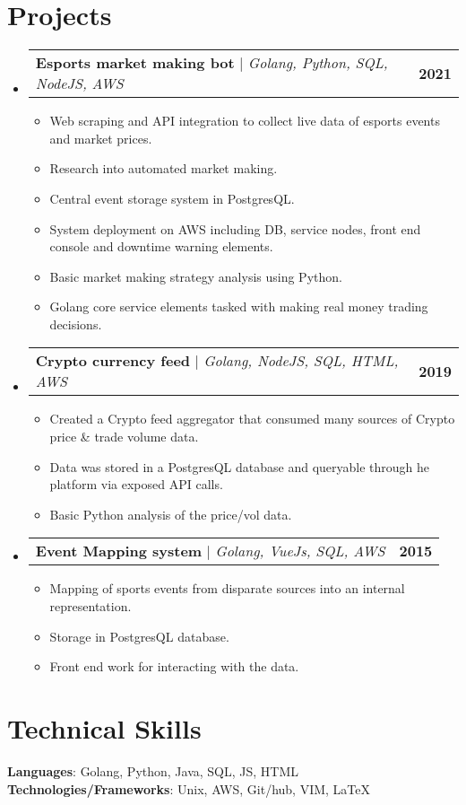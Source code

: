 \documentclass[letterpaper,11pt]{article}
\makeatletter
\newcommand{\resumeItem}[1]{
  \item\small{
    {#1 \vspace{-2pt}}
  }
}
\newcommand{\resumeProjectHeading}[2]{
    \item
    \begin{tabular*}{1.001\textwidth}{l@{\extracolsep{\fill}}r}
      \small#1 & \textbf{\small #2}\\
    \end{tabular*}\vspace{-7pt}
}
\newcommand{\resumeSubHeadingListStart}{\begin{itemize}[leftmargin=0.0in, label={}]}
\newcommand{\resumeSubHeadingListEnd}{\end{itemize}}
\newcommand{\resumeItemListStart}{\begin{itemize}}
\newcommand{\resumeItemListEnd}{\end{itemize}\vspace{-5pt}}
\makeatother
\begin{document}
\section{Projects}
    \vspace{-5pt}
    \resumeSubHeadingListStart
      \resumeProjectHeading
          {\textbf{Esports market making bot} $|$ \emph{Golang, Python, SQL, NodeJS, AWS}}{2021}
          \resumeItemListStart
            \resumeItem{Web scraping and API integration to collect live data of esports events and market prices.}
            \resumeItem{Research into automated market making.}
            \resumeItem{Central event storage system in PostgresQL.}
            \resumeItem{System deployment on AWS including DB, service nodes, front end console and downtime warning elements.}
            \resumeItem{Basic market making strategy analysis using Python.}
            \resumeItem{Golang core service elements tasked with making real money trading decisions.}
          \resumeItemListEnd
          \vspace{-13pt}
      \resumeProjectHeading
          {\textbf{Crypto currency feed} $|$ \emph{Golang, NodeJS, SQL, HTML, AWS}}{2019}
          \resumeItemListStart
            \resumeItem{Created a Crypto feed aggregator that consumed many sources of Crypto price \& trade volume data.}
            \resumeItem{Data was stored in a PostgresQL database and queryable through he platform via exposed API calls.}
            \resumeItem{Basic Python analysis of the price/vol data.}
          \resumeItemListEnd 
          \vspace{-13pt}
          \resumeProjectHeading
          {\textbf{Event Mapping system} $|$ \emph{Golang, VueJs, SQL, AWS}}{2015}
          \resumeItemListStart
            \resumeItem{Mapping of sports events from disparate sources into an internal representation.}
            \resumeItem{Storage in PostgresQL database.}
            \resumeItem{Front end work for interacting with the data.}
          \resumeItemListEnd 
    \resumeSubHeadingListEnd
\vspace{-15pt}


%
\section{Technical Skills}
 \begin{itemize}[leftmargin=0.15in, label={}]
    \small{\item{
     \textbf{Languages}{: Golang, Python, Java, SQL, JS, HTML} \\
     \textbf{Technologies/Frameworks}{: Unix, AWS, Git/hub, VIM, LaTeX} \\
    }}
 \end{itemize}
 \vspace{-16pt}
\end{document}
